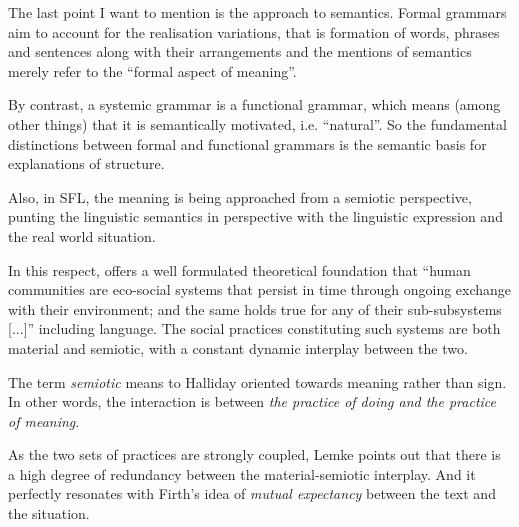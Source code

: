 
The last point I want to mention is the approach to semantics. Formal grammars aim to account for the realisation variations, that is formation of words, phrases and sentences along with their arrangements and the mentions of semantics merely refer to the ``formal aspect of meaning''. 

By contrast, a systemic grammar is a functional grammar, which means (among other things) that it is semantically motivated, i.e. ``natural''. So the fundamental distinctions between formal and functional grammars is the semantic basis for explanations of structure. 

Also, in SFL, the meaning is being approached from a semiotic perspective, punting the linguistic semantics in perspective with the linguistic expression and the real world situation. 
 
In this respect, \citet{Lemke93} offers a well formulated theoretical foundation that ``human communities are eco-social systems that persist in time through ongoing exchange with their environment; and the same holds true for any of their sub-subsystems [...]'' including language. The social practices constituting such systems are both material and semiotic, with a constant dynamic interplay between the two. \citep[p.387]{Halliday2002}

The term \textit{semiotic} means to Halliday oriented towards meaning rather than sign. In other words, the interaction is between \textit{the practice of doing and the practice of meaning}.  

As the two sets of practices are strongly coupled, Lemke points out that there is a high degree of redundancy between the material-semiotic interplay. And it perfectly resonates with Firth's idea of \textit{mutual expectancy} between the text and the situation.

